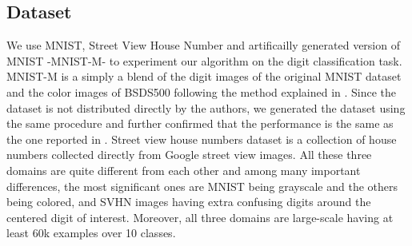 \begin{table}[ht]
\vspace{-2mm}
\caption{Accuracy on the digit classification task.}
\label{tab:res2}
\begin{sc}
\begin{small}
\end{small}
\end{sc}
\vspace{-7mm}
\end{table}

\vspace{-2mm}
\subsection{Dataset}
We use MNIST\cite{mnist}, Street View House Number\cite{svhn} and artificailly generated version of MNIST -MNIST-M- \cite{ganin15} to experiment our algorithm on the digit classification task. MNIST-M is a simply a blend of the digit images of the original MNIST dataset and the color images of BSDS500\cite{bsds500} following the method explained in \cite{ganin15}. Since the dataset is not distributed directly by the authors, we generated the dataset using the same procedure and further confirmed that the performance is the same as the one reported in \cite{ganin15}. Street view house numbers dataset is a collection of house numbers collected directly from Google street view images. All these three domains are quite different from each other and among many important differences, the most significant ones are MNIST being grayscale and the others being colored, and SVHN images having extra confusing digits around the centered digit of interest. Moreover, all three domains are large-scale having at least 60k examples over 10 classes. 

